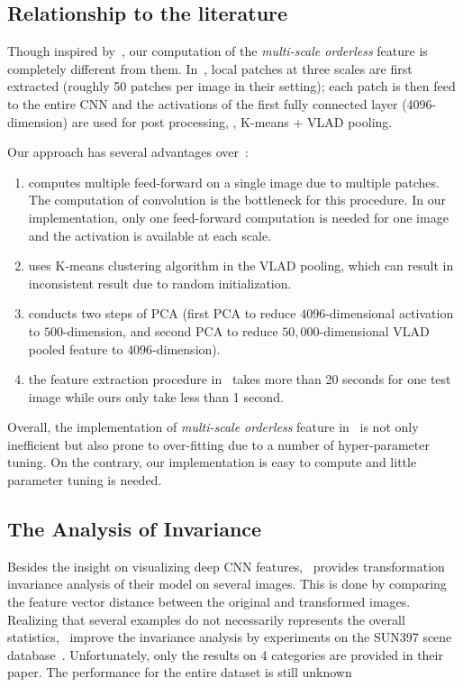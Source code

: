 \documentclass[10pt,twocolumn,letterpaper]{article}
\begin{document}
\subsection{Relationship to the literature}

Though inspired by~\cite{Gong14}, our computation of the \textit{multi-scale orderless} feature is completely different from them. In~\cite{Gong14}, local patches at three scales are first extracted (roughly 50 patches per image in their setting); each patch is then feed to the entire CNN and the activations of the first fully connected layer (4096-dimension) are used for post processing, \ie, K-means + VLAD pooling. 

Our approach has several advantages over~\cite{Gong14}:
\begin{enumerate}
\item \cite{Gong14} computes multiple feed-forward on a single image due to multiple patches. The computation of convolution is the bottleneck for this procedure. In our implementation, only one feed-forward computation is needed for one image and the activation is available at each scale.
\item \cite{Gong14} uses K-means clustering algorithm in the VLAD pooling, which can result in inconsistent result due to random initialization. 
\item \cite{Gong14} conducts two steps of PCA (first PCA to reduce $4096$-dimensional activation to $500$-dimension, and second PCA to reduce $50,000$-dimensional VLAD pooled feature to $4096$-dimension). 
\item the feature extraction procedure in~\cite{Gong14} takes more than 20 seconds for one test image while ours only take less than 1 second. 
\end{enumerate} 

Overall, the implementation of \textit{multi-scale orderless} feature in~\cite{Gong14} is not only inefficient but also prone to over-fitting due to a number of hyper-parameter tuning. On the contrary, our implementation is easy to compute and little parameter tuning is needed. 

\subsection{The Analysis of Invariance}

Besides the insight on visualizing deep CNN features,~\cite{visual_cnn} provides transformation invariance analysis of their model on several images. This is done by comparing the feature vector distance between the original and transformed images. Realizing that several examples do not necessarily represents the overall statistics,~\cite{Gong14} improve the invariance analysis by experiments on the SUN397 scene database~\cite{SUN397}. Unfortunately, only the results on 4 categories are provided in their paper. The performance for the entire dataset is still unknown
\end{document}
